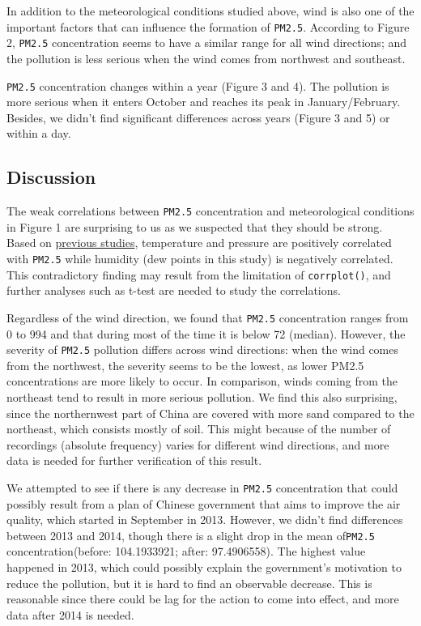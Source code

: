 \documentclass[
]{article}
\begin{document}
In addition to the meteorological conditions studied above, wind is also
one of the important factors that can influence the formation of
\texttt{PM2.5}. According to Figure 2, \texttt{PM2.5} concentration
seems to have a similar range for all wind directions; and the pollution
is less serious when the wind comes from northwest and southeast.

\texttt{PM2.5} concentration changes within a year (Figure 3 and 4). The
pollution is more serious when it enters October and reaches its peak in
January/February. Besides, we didn't find significant differences across
years (Figure 3 and 5) or within a day.

\hypertarget{discussion}{%
\subsection{Discussion}\label{discussion}}

The weak correlations between \texttt{PM2.5} concentration and
meteorological conditions in Figure 1 are surprising to us as we
suspected that they should be strong. Based on
\href{https://www.atmos-chem-phys.net/18/5343/2018/acp-18-5343-2018.pdf}{previous
studies}, temperature and pressure are positively correlated with
\texttt{PM2.5} while humidity (dew points in this study) is negatively
correlated. This contradictory finding may result from the limitation of
\texttt{corrplot()}, and further analyses such as t-test are needed to
study the correlations.

Regardless of the wind direction, we found that \texttt{PM2.5}
concentration ranges from 0 to 994 and that during most of the time it
is below 72 (median). However, the severity of \texttt{PM2.5} pollution
differs across wind directions: when the wind comes from the northwest,
the severity seems to be the lowest, as lower PM2.5 concentrations are
more likely to occur. In comparison, winds coming from the northeast
tend to result in more serious pollution. We find this also surprising,
since the northernwest part of China are covered with more sand compared
to the northeast, which consists mostly of soil. This might because of
the number of recordings (absolute frequency) varies for different wind
directions, and more data is needed for further verification of this
result.

We attempted to see if there is any decrease in \texttt{PM2.5}
concentration that could possibly result from a plan of Chinese
government that aims to improve the air quality, which started in
September in 2013. However, we didn't find differences between 2013 and
2014, though there is a slight drop in the mean of\texttt{PM2.5}
concentration(before: 104.1933921; after: 97.4906558). The highest value
happened in 2013, which could possibly explain the government's
motivation to reduce the pollution, but it is hard to find an observable
decrease. This is reasonable since there could be lag for the action to
come into effect, and more data after 2014 is needed.
\end{document}
